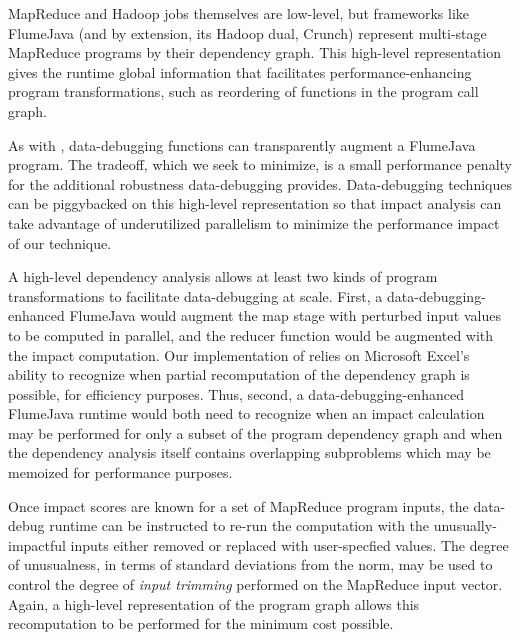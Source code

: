 MapReduce and Hadoop jobs themselves are low-level, but frameworks like FlumeJava (and by extension, its Hadoop dual, Crunch) represent multi-stage MapReduce programs by their dependency graph.  This high-level representation gives the runtime global information that facilitates performance-enhancing program transformations, such as reordering of functions in the program call graph.

As with \checkcell, data-debugging functions can transparently augment a FlumeJava program.  The tradeoff, which we seek to minimize, is a small performance penalty for the additional robustness data-debugging provides. Data-debugging techniques can be piggybacked on this high-level representation so that impact analysis can take advantage of underutilized parallelism to minimize the performance impact of our technique.

A high-level dependency analysis allows at least two kinds of program transformations to facilitate data-debugging at scale.  First, a data-debugging-enhanced FlumeJava would augment the map stage with perturbed input values to be computed in parallel, and the reducer function would be augmented with the impact computation.  Our implementation of \checkcell relies on Microsoft Excel's ability to recognize when partial recomputation of the dependency graph is possible, for efficiency purposes.  Thus, second, a data-debugging-enhanced FlumeJava runtime would both need to recognize when an impact calculation may be performed for only a subset of the program dependency graph and when the dependency analysis itself contains overlapping subproblems which may be memoized for performance purposes.

Once impact scores are known for a set of MapReduce program inputs, the data-debug runtime can be instructed to re-run the computation with the unusually-impactful inputs either removed or replaced with user-specfied values.  The degree of unusualness, in terms of standard deviations from the norm, may be used to control the degree of \emph{input trimming} performed on the MapReduce input vector.  Again, a high-level representation of the program graph allows this recomputation to be performed for the minimum cost possible.